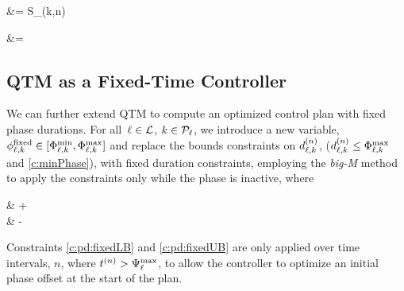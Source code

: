 \begin{cAlign} 
%
 &= S_{\ell}(k,n)
%
\end{cAlign}
\begin{cAlign} 
%
 &= 
%
\end{cAlign}



\subsection{QTM as a Fixed-Time Controller}

We can further extend QTM to compute an optimized control plan
with fixed phase durations. For all~$\tl \in \Lset$, $k \in \Pset_\tl$, we introduce a new variable, 
$\PTFIXED{\ell}{k} \in [\PTMIN{\ell}{k}, \PTMAX{\ell}{k} ]$
and replace the bounds constraints on $\pd[n]{\ell}{k}$,
($\pd[n]{\ell}{k} \le \PTMAX{\ell}{k}$ and \ref{c:minPhase}), with fixed duration
constraints, employing the \textit{big-M} method to apply the constraints only
while the phase is inactive, where 
%
\begin{cAlign}
         &\le {} +  
  \\
%
   &\ge {} -  
\end{cAlign}
 
Constraints \ref{c:pd:fixedLB} and \ref{c:pd:fixedUB} are only applied over time
intervals, $n$, where $\tn[n] > \CTMAX{\tl}$, to allow the controller to optimize an
 initial phase offset at the start of the plan.



